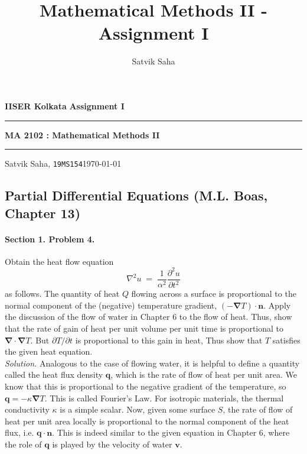 \documentclass[10pt]{article}
\title{Mathematical Methods II - Assignment I}
\author{Satvik Saha}
\date{}
\newcommand\ve[1]{\boldsymbol{#1}}
\newcommand\pp[3][]{\frac{\partial^{#1}{#2}}{\partial {#3}^{#1}}}
\newcommand\grad[1]{\ve{\nabla}#1}
\newcommand\divg[1]{\ve{\nabla}\cdot#1}
\newcommand\lapl[1]{\nabla^2 #1}
\begin{document}
        \par\textbf{IISER Kolkata} \hfill \textbf{Assignment I}
        \vspace{3pt}
        \hrule
        \vspace{3pt}
        \begin{center}
                \LARGE{\textbf{MA 2102 : Mathematical Methods II}}
        \end{center}
        \vspace{3pt}
        \hrule
        \vspace{3pt}
        Satvik Saha, \texttt{19MS154}\hfill\today
        \vspace{20pt}
        \subsection*{Partial Differential Equations (M.L. Boas, Chapter 13)}
        \paragraph{Section 1. Problem 4.} Obtain the heat flow equation
        \[
                \lapl{u} \;=\; \frac{1}{\alpha^2}\pp[2]{u}{t}
        \] as follows. The quantity of heat $Q$ flowing across a surface is proportional to the normal component of the (negative) temperature gradient,
        $(-\grad{T})\cdot\ve{n}$. Apply the discussion of the flow of water in Chapter 6 to the flow of heat.
        Thus, show that the rate of gain of heat per unit volume per unit time is proportional to $\divg{\grad{T}}$.
        But $\partial T /\partial t$ is proportional to this gain in heat, Thus show that $T$ satisfies the given heat equation. \\

        \textit{Solution.} Analogous to the case of flowing water, it is helpful to define a quantity called the heat flux density $\ve{q}$,
        which is the rate of flow of heat per unit area. We know that this is proportional to the negative gradient of the temperature,
        so $\ve{q} = -\kappa\grad{T}$. This is called Fourier's Law. For isotropic materials, the thermal conductivity $\kappa$ is a simple scalar.
        Now, given some surface $S$, the rate of flow of heat per unit area locally is proportional to the normal component of the heat flux,
        i.e. $\ve{q}\cdot\ve{n}$.
        This is indeed similar to the given equation in Chapter 6, where the role of $\ve{q}$ is played by the velocity of water $\ve{v}$. \\
\end{document}
